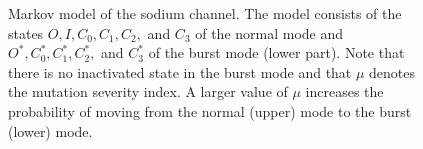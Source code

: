 \begin{figure}[ptb]
\begin{center}
\end{center}\caption{Markov model of the sodium channel. The model consists of the states
$O,I,C_{0},C_{1},C_{2},$ and $C_{3}$ of the normal mode and $O^{*},C^{*}%
_{0},C^{*}_{1},C^{*}_{2},$ and $C^{*}_{3}$ of the burst mode (lower part). Note
that there is no inactivated state in the burst mode and that $\mu$ denotes
the mutation severity index. A larger value of $\mu$ increases the probability
of moving from the normal (upper) mode to the burst (lower) mode.}%
\label{burst}%
\end{figure}

